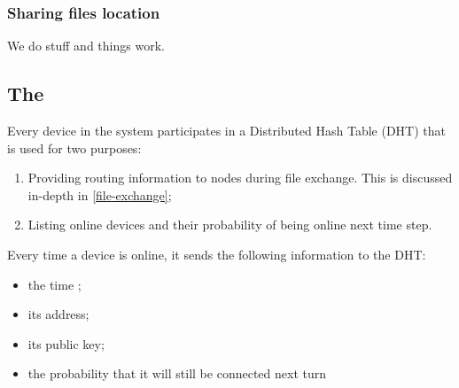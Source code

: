 
\subsubsection{Sharing files location}%
\label{ssub:sharing_files_location}

We do stuff and things work.


\subsection{The \globaloverlay}%
\label{global-overlay}


Every device in the system participates in a Distributed Hash Table (DHT) that is used for two purposes:
\begin{enumerate}
  \item Providing routing information to nodes during file exchange. This is 
    discussed in-depth in \cref{file-exchange};
	\item Listing online devices and their probability of being online next time step.
\end{enumerate}

Every time a device is online, it sends the following information to the DHT:
\begin{itemize}
	\item the time ;
	\item its address;
	\item its public key;
	\item the probability that it will still be connected next turn 
\end{itemize}


